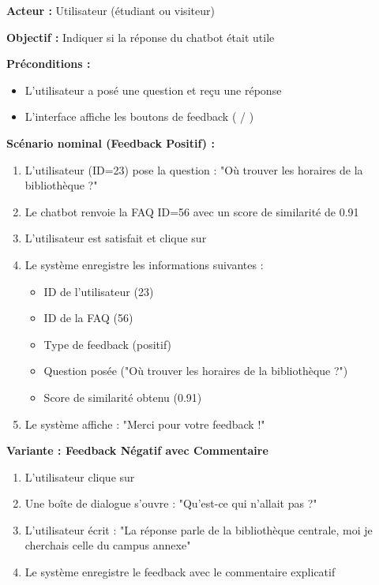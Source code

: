 \documentclass[11pt,a4paper]{article}
\begin{document}
\textbf{Acteur :} Utilisateur (étudiant ou visiteur)

\textbf{Objectif :} Indiquer si la réponse du chatbot était utile

\textbf{Préconditions :}
\begin{itemize}
    \item L'utilisateur a posé une question et reçu une réponse
    \item L'interface affiche les boutons de feedback (\faThumbsUp{} / \faThumbsDown{})
\end{itemize}

\textbf{Scénario nominal (Feedback Positif) :}

\begin{enumerate}
    \item L'utilisateur (ID=23) pose la question : "Où trouver les horaires de la bibliothèque ?"
    \item Le chatbot renvoie la FAQ ID=56 avec un score de similarité de 0.91
    \item L'utilisateur est satisfait et clique sur \faThumbsUp
    \item Le système enregistre les informations suivantes :
    \begin{itemize}
        \item ID de l'utilisateur (23)
        \item ID de la FAQ (56)
        \item Type de feedback (positif)
        \item Question posée ("Où trouver les horaires de la bibliothèque ?")
        \item Score de similarité obtenu (0.91)
    \end{itemize}
    \item Le système affiche : "Merci pour votre feedback !"
\end{enumerate}

\textbf{Variante : Feedback Négatif avec Commentaire}

\begin{enumerate}
    \item L'utilisateur clique sur \faThumbsDown
    \item Une boîte de dialogue s'ouvre : "Qu'est-ce qui n'allait pas ?"
    \item L'utilisateur écrit : "La réponse parle de la bibliothèque centrale, moi je cherchais celle du campus annexe"
    \item Le système enregistre le feedback avec le commentaire explicatif
\end{enumerate}
\end{document}
